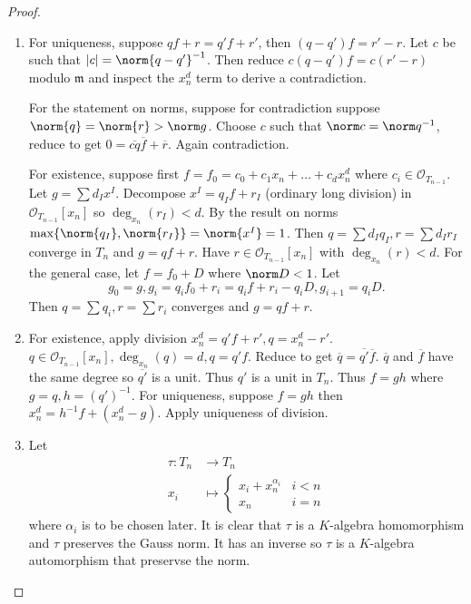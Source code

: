 \documentclass[a4paper]{article}
\renewcommand*{\O}{\mathcal{O}}
\begin{document}
\begin{proof}\leavevmode
  \begin{enumerate}
  \item For uniqueness, suppose \(qf + r = q'f + r'\), then \((q - q')f = r' - r\). Let \(c\) be such that \(|c| = \norm{q - q'}^{-1}\). Then reduce \(c(q - q') f = c(r' - r)\) modulo \(\mathfrak m\) and inspect the \(x_n^d\) term to derive a contradiction.

    For the statement on norms, suppose for contradiction suppose \(\norm{q} = \norm{r} > \norm g\). Choose \(c\) such that \(\norm c = \norm q^{-1}\), reduce to get \(0 = \overline{cq} \overline f + \overline r\). Again contradiction.

    For existence, suppose first \(f = f_0 = c_0 + c_1x_n + \dots + c_d x_n^d\) where \(c_i \in \O_{T_{n - 1}}\). Let \(g = \sum d_Ix^I\). Decompose \(x^I = q_If + r_I\) (ordinary long division) in \(\O_{T_{n - 1}}[x_n]\) so \(\deg_{x_n}(r_I) < d\). By the result on norms \(\max\{\norm{q_I}, \norm{r_I}\} = \norm{x^I} = 1\). Then \(q = \sum d_I q_I, r = \sum d_Ir_I\) converge in \(T_n\) and \(g = qf + r\). Have \(r \in \O_{T_{n - 1}}[x_n]\) with \(\deg_{x_n}(r) < d\). For the general case, let \(f = f_0 + D\) where \(\norm D < 1\). Let
    \[
      g_0 = g, g_i = q_i f_0 + r_i = q_if + r_i - q_iD, g_{i + 1} = q_iD.
    \]
    Then \(q = \sum q_i, r = \sum r_i\) converges and \(g = qf + r\).
  \item For existence, apply division \(x_n^d = q'f + r', q = x_n^d - r'\). \(q \in \O_{T_{n - 1}}[x_n], \deg_{x_n}(q) = d, q = q'f\). Reduce to get \(\overline q = \overline{q'} \overline f\). \(\overline q\) and \(\overline f\) have the same degree so \(\overline{q'}\) is a unit. Thus \(q'\) is a unit in \(T_n\). Thus \(f = gh\) where \(g = q, h = (q')^{-1}\). For uniqueness, suppose \(f = gh\) then \(x_n^d = h^{-1}f + (x_n^d - g)\). Apply uniqueness of division.
  \item Let
    \begin{align*}
      \tau: T_n &\to T_n \\
      x_i &\mapsto
            \begin{cases}
              x_i + x_n^{\alpha_i} & i < n \\
              x_n & i = n
            \end{cases}
    \end{align*}
    where \(\alpha_i\) is to be chosen later. It is clear that \(\tau\) is a \(K\)-algebra homomorphism and \(\tau\) preserves the Gauss norm. It has an inverse so \(\tau\) is a \(K\)-algebra automorphism that preservse the norm.


\end{enumerate}
\end{proof}
\end{document}

